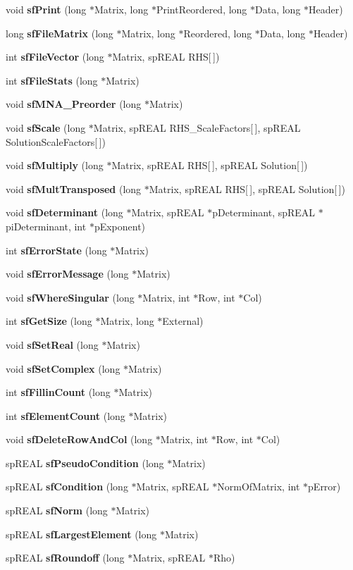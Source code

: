 \begin{CompactItemize}
\item 
void {\bf sf\-Print} (long $\ast$Matrix, long $\ast$Print\-Reordered, long $\ast$Data, long $\ast$Header)
\item 
long {\bf sf\-File\-Matrix} (long $\ast$Matrix, long $\ast$Reordered, long $\ast$Data, long $\ast$Header)
\item 
int {\bf sf\-File\-Vector} (long $\ast$Matrix, sp\-REAL RHS[$\,$])
\item 
int {\bf sf\-File\-Stats} (long $\ast$Matrix)
\item 
void {\bf sf\-MNA\_\-Preorder} (long $\ast$Matrix)
\item 
void {\bf sf\-Scale} (long $\ast$Matrix, sp\-REAL RHS\_\-Scale\-Factors[$\,$], sp\-REAL Solution\-Scale\-Factors[$\,$])
\item 
void {\bf sf\-Multiply} (long $\ast$Matrix, sp\-REAL RHS[$\,$], sp\-REAL Solution[$\,$])
\item 
void {\bf sf\-Mult\-Transposed} (long $\ast$Matrix, sp\-REAL RHS[$\,$], sp\-REAL Solution[$\,$])
\item 
void {\bf sf\-Determinant} (long $\ast$Matrix, sp\-REAL $\ast$p\-Determinant, sp\-REAL $\ast$pi\-Determinant, int $\ast$p\-Exponent)
\item 
int {\bf sf\-Error\-State} (long $\ast$Matrix)
\item 
void {\bf sf\-Error\-Message} (long $\ast$Matrix)
\item 
void {\bf sf\-Where\-Singular} (long $\ast$Matrix, int $\ast$Row, int $\ast$Col)
\item 
int {\bf sf\-Get\-Size} (long $\ast$Matrix, long $\ast$External)
\item 
void {\bf sf\-Set\-Real} (long $\ast$Matrix)
\item 
void {\bf sf\-Set\-Complex} (long $\ast$Matrix)
\item 
int {\bf sf\-Fillin\-Count} (long $\ast$Matrix)
\item 
int {\bf sf\-Element\-Count} (long $\ast$Matrix)
\item 
void {\bf sf\-Delete\-Row\-And\-Col} (long $\ast$Matrix, int $\ast$Row, int $\ast$Col)
\item 
sp\-REAL {\bf sf\-Pseudo\-Condition} (long $\ast$Matrix)
\item 
sp\-REAL {\bf sf\-Condition} (long $\ast$Matrix, sp\-REAL $\ast$Norm\-Of\-Matrix, int $\ast$p\-Error)
\item 
sp\-REAL {\bf sf\-Norm} (long $\ast$Matrix)
\item 
sp\-REAL {\bf sf\-Largest\-Element} (long $\ast$Matrix)
\item 
sp\-REAL {\bf sf\-Roundoff} (long $\ast$Matrix, sp\-REAL $\ast$Rho)
\end{CompactItemize}


